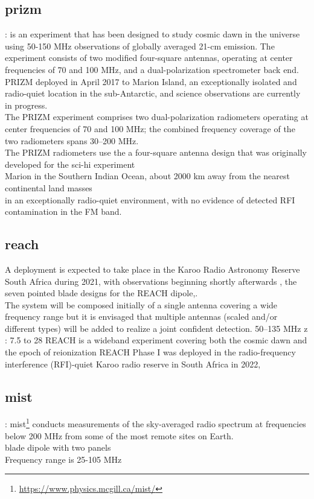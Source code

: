 \documentclass[12pt, TexShade, letterpaper]{report}
\begin{document}
\subsection{\gls{prizm}} \cite{prizm_2017, prizm_thesis}: is an experiment that has been designed to study cosmic dawn in the universe using 50-150 MHz observations of globally averaged 21-cm emission. The experiment consists of two modified four-square antennas, operating at center frequencies of 70 and 100 MHz, and a dual-polarization spectrometer back end. PRIZM deployed in April 2017 to Marion Island, an exceptionally isolated and radio-quiet location in the sub-Antarctic, and science observations are currently in progress. \cite{sci-hi_1, sci-hi_2}\\
The PRIZM experiment comprises two dual-polarization radiometers operating at center frequencies of 70 and 100 MHz; the combined frequency coverage of the two radiometers spans 30–200 MHz.\\
The PRIZM radiometers use the a four-square antenna design that was originally developed for the \gls{sci-hi} experiment\\
Marion in the Southern Indian Ocean, about 2000 km away from the nearest continental land masses\\
in an exceptionally radio-quiet environment, with no evidence of detected RFI contamination in the FM band.

\subsection{\gls{reach}}
A deployment is expected to take place in the Karoo Radio Astronomy Reserve South Africa during 2021, with observations beginning shortly afterwards , the seven pointed blade designs for the REACH dipole,\cite{reach_design}.\\
The system will be composed initially of a single antenna covering a wide frequency range but it is envisaged that multiple antennas (scaled and/or different types) will be added to realize a joint confident detection.\cite{reach}
50–135 MHz \cite{reach_design}
z : 7.5 to 28 \cite{reach_z}
REACH is a wideband experiment covering both the cosmic dawn and the epoch of reionization
REACH Phase I was deployed in the radio-frequency interference (RFI)-quiet Karoo radio reserve in South Africa in 2022, \cite{reach_z}

\subsection{\gls{mist}}:
 \gls{mist}\footnote{\hyperlink{https://www.physics.mcgill.ca/mist/}{https://www.physics.mcgill.ca/mist/}} \cite{mist, mist_presentation} conducts measurements of the sky-averaged radio spectrum at frequencies below 200 MHz from some of the most remote sites on Earth.\\
 blade dipole with two panels\\
 Frequency range is 25-105 MHz
 
\end{document}
